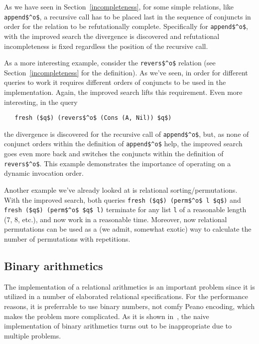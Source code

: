 As we have seen in Section~\ref{incompleteness}, for some simple relations, like \lstinline|append$^o$|,
a recursive call has to be placed last in the sequence of conjuncts in order for the 
relation to be refutationally complete. Specifically for \lstinline|append$^o$|, with the improved search 
the divergence is discovered and refutational incompleteness is fixed regardless the position of 
the recursive call.

As a more interesting example, consider the \lstinline|revers$^o$| relation (see Section~\ref{incompleteness}
for the definition). As we've seen, in order for different queries to work it requires different orders of conjuncts 
to be used in the implementation. Again, the improved search lifts this requirement.
Even more interesting, in the query 

\begin{lstlisting}
   fresh ($q$) (revers$^o$ (Cons (A, Nil)) $q$)
\end{lstlisting}

\noindent the divergence is discovered for the recursive call of \lstinline|append$^o$|, but,
as none of conjunct orders within the definition of \lstinline|append$^o$| help, the
improved search goes even more back and switches the conjuncts within the definition of
\lstinline|revers$^o$|. This example demonstrates the importance of operating on 
a dynamic invocation order.

Another example we've already looked at is relational sorting/permutations. 
With the improved search, both queries \lstinline|fresh ($q$) (perm$^o$ l $q$)| and 
\lstinline|fresh ($q$) (perm$^o$ $q$ l)| terminate for any list \lstinline|l| of a reasonable 
length (7, 8, etc.), and now work in a reasonable time. Moreover, now
relational permutations can be used as a (we admit, somewhat exotic) way to calculate 
the number of permutations with repetitions.

\subsection{Binary arithmetics}

The implementation of a relational arithmetics is an important problem since it is utilized
in a number of elaborated relational specifications. For the performance reasons, it is 
preferrable to use binary numbers, not comfy Peano encoding, which makes the problem 
more complicated. As it is shown in~\cite{WillThesis}, the naive implementation of 
binary arithmetics turns out to be inappropriate due to multiple problems. 

